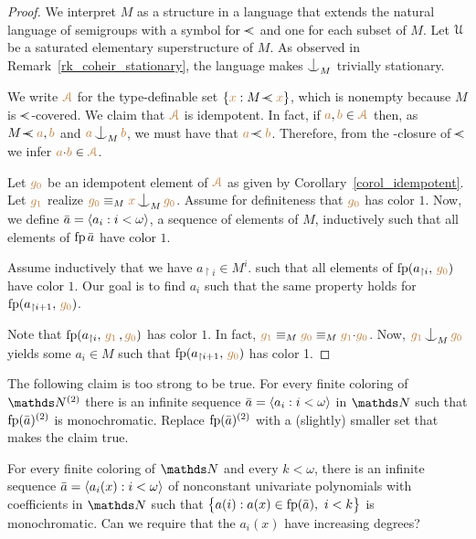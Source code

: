 \begin{proof}
We interpret $M$ as a structure in a language 
that extends the natural language of semigroups
with a symbol for $\cpaw$ and one for each subset of $M$.
%
Let $\EuScript U$ be a saturated elementary superstructure of $M$.
%
As observed in Remark~\ref{rk_coheir_stationary}, 
the language makes $\nonfork_M$ trivially stationary.

We write ${\color{brown}\EuScript A}$ for the type-definable set $\{{\mr x} : M\cpaw{\mr x}\}$,
which is nonempty because $M$ is $\cpaw$-covered.
%
We claim that ${\color{brown}\EuScript A}$ is idempotent.
%
In fact, if ${\color{brown} a},{\color{brown} b}\in{\color{brown}\EuScript A}$ 
then, as $M\cpaw{\mr a},{\mr b}$ and ${\mr a}\nonfork_M{\mr b}$, 
we must have that ${\mr a}\cpaw{\mr b}$.
%
Therefore, from the \cpawdot-closure of $\cpaw$ we infer ${\color{brown} a}{\cdot}{\color{brown} b}\in{\color{brown}\EuScript A}$.

Let ${\color{brown} g_0}$ be an idempotent element of ${\color{brown}\EuScript A}$
as given by Corollary~\ref{corol_idempotent}.
Let ${\color{brown} g_1}$ realize ${\mr g_0}\equiv_M{\mr x}\nonfork_M{\mr g_0}$.
%
Assume for definiteness that ${\color{brown} g_0}$ has color $1$.
%
Now, we define $\bar a=\langle a_i:i<\omega\rangle$, a sequence of elements of $M$, inductively such that all elements of ${\rm fp}\,\bar a$ have color $1$.

Assume inductively that we have $a_{\restriction i}\in M^i$. 
such that all elements of ${\rm fp}(a_{\restriction i},\,{\color{brown} g_0})$ have color $1$.
%
Our goal is to find $a_i$ 
such that the same property holds for ${\rm fp}(a_{\restriction i+1},\,{\color{brown} g_0})$.

Note that ${\rm fp}(a_{\restriction i},\,{\color{brown} g_1}\,,{\color{brown} g_0})$ has color $1$.
In fact, ${\color{brown} g_1}\equiv_M{\color{brown} g_0}\equiv_M{\color{brown} g_1}{\cdot}{\color{brown} g_0}$.
Now, ${\mr g_1}\nonfork_M{\mr g_0}$ yields some $a_i\in M$ such that  ${\rm fp}(a_{\restriction i+1},\,{\color{brown} g_0})$ has color 1.
\end{proof}

\begin{exercise}
  The following claim is too strong to be true.
  For every finite coloring of $\NN^{(2)}$ there is an infinite sequence $\bar a=\langle a_i:i<\omega\rangle$ in $\NN$ such that ${\rm fp}(\bar a)^{(2)}$ is monochromatic.
  Replace ${\rm fp}(\bar a)^{(2)}$ with a (slightly) smaller set that makes the claim true.
\end{exercise}

\begin{exercise}
  For every finite coloring of $\NN$ and every $k<\omega$, 
  there is an infinite sequence $\bar a=\langle a_i(x):i<\omega\rangle$ of nonconstant univariate polynomials with coefficients in $\NN$ such that $\big\{a(i): a(x)\in\fp(\bar a),\ i<k\big\}$ is monochromatic.
  Can we require that the $a_i(x)$ have increasing degrees?
\end{exercise}

